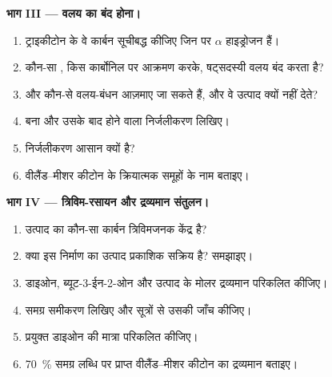 \begin{problem}
\medskip
\noindent\textbf{भाग III --- वलय का बंद होना।}
\begin{enumerate}[resume]
  \item ट्राइकीटोन के वे कार्बन सूचीबद्ध कीजिए जिन पर $\alpha$ हाइड्रोजन हैं।
  \item कौन-सा , किस कार्बोनिल पर आक्रमण करके, षट्सदस्यी वलय बंद करता है?
  \item और कौन-से वलय-बंधन आज़माए जा सकते हैं, और वे उत्पाद क्यों नहीं देते?
  \item बना  और उसके बाद होने वाला निर्जलीकरण लिखिए।
  \item निर्जलीकरण आसान क्यों है?
  \item वीलैंड--मीशर कीटोन के क्रियात्मक समूहों के नाम बताइए।
\end{enumerate}

\medskip
\noindent\textbf{भाग IV --- त्रिविम-रसायन और द्रव्यमान संतुलन।}
\begin{enumerate}[resume]
  \item उत्पाद का कौन-सा कार्बन त्रिविमजनक केंद्र है?
  \item क्या इस निर्माण का उत्पाद प्रकाशिक सक्रिय है? समझाइए।
  \item डाइओन, ब्यूट-3-ईन-2-ओन और उत्पाद
         के मोलर द्रव्यमान परिकलित कीजिए।
  \item समग्र समीकरण लिखिए और सूत्रों से उसकी जाँच कीजिए।
  \item प्रयुक्त डाइओन की मात्रा परिकलित कीजिए।
  \item 70~\% समग्र लब्धि पर प्राप्त वीलैंड--मीशर कीटोन का द्रव्यमान बताइए।
\end{enumerate}
\end{problem}
